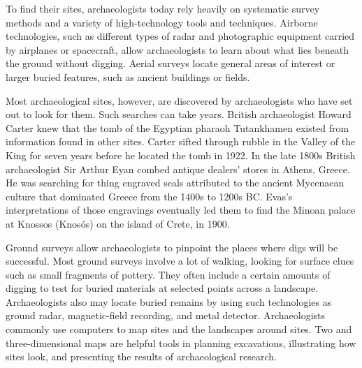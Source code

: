 \begin{listmatch}
\item 
 To find their sites, archaeologists today rely heavily on
systematic survey methods and a variety of high-technology tools and
techniques. Airborne technologies, such as different types of radar and
photographic equipment carried by airplanes or spacecraft, allow
archaeologists to learn about what lies beneath the ground without
digging. Aerial surveys locate general areas of interest or larger
buried features, such as ancient buildings or fields.


\item 
 Most archaeological sites, however, are discovered by
archaeologists who have set out to look for them. Such searches can take
years. British archaeologist Howard Carter knew that the tomb of the
Egyptian pharaoh Tutankhamen existed from information found in other
sites. Carter sifted through rubble in the Valley of the King for seven
years before he located the tomb in 1922. In the late 1800s British
archaeologist Sir Arthur Eyan combed antique dealers' stores in Athens,
Greece. He was searching for thing engraved seals attributed to the
ancient Mycenaean culture that dominated Greece from the 1400s to 1200s
BC. Evas's interpretations of those engravings eventually led them to
find the Minoan palace at Knossos (Knos\'os) on the island of Crete, in 1900.


\item 
 Ground surveys allow archaeologists to pinpoint the places where
digs will be successful. Most ground surveys involve a lot of walking,
looking for surface clues such as small fragments of pottery. They often
include a certain amounts of digging to test for buried materials at
selected points across a landscape. Archaeologists also may locate
buried remains by using such technologies as ground radar,
magnetic-field recording, and metal detector. Archaeologists commonly
use computers to map sites and the landscapes around sites. Two and
three-dimensional maps are helpful tools in planning excavations,
illustrating how sites look, and presenting the results of
archaeological research.


\end{listmatch}


